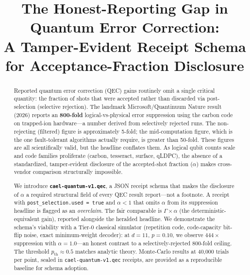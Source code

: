 \documentclass[conference]{IEEEtran}
\newcommand{\pth}{p_{\mathrm{th}}}  %
\newcommand{\af}{\alpha}            %
\newcommand{\suppfactor}{\Gamma}    %
\begin{document}
\title{The Honest-Reporting Gap in Quantum Error Correction:\\
A Tamper-Evident Receipt Schema for Acceptance-Fraction Disclosure}

\author{%
}

\maketitle

\begin{abstract}
Reported quantum error correction (QEC) gains routinely omit a single
critical quantity: the fraction of shots that were accepted rather than
discarded via post-selection (selective rejection).
The landmark Microsoft/Quantinuum Nature result (2026) reports an
\textbf{800-fold} logical-vs-physical error suppression using the carbon
code on trapped-ion hardware---a number derived from selectively rejected
runs. The non-rejecting (filtered) figure is approximately 5-fold; the
mid-computation figure, which is the one fault-tolerant algorithms
actually require, is greater than 50-fold. These figures are all
scientifically valid, but the headline conflates them. As logical qubit
counts scale and code families proliferate (carbon, tesseract, surface,
qLDPC), the absence of a standardized, tamper-evident disclosure of
the accepted-shot fraction ($\af$) makes cross-vendor comparison
structurally impossible.

We introduce \textbf{\texttt{cael-quantum-v1.qec}}, a JSON receipt schema
that makes the disclosure of $\af$ a required structural field of every
QEC result report---not a footnote. A receipt with
\texttt{post\_selection.used = true} and $\af < 1$ that omits $\af$ from
its suppression headline is flagged as an \emph{overclaim}. The fair
comparable is $\suppfactor \times \af$ (the deterministic-equivalent
gain), reported alongside the heralded headline. We demonstrate the
schema's viability with a Tier-0 classical simulator (repetition code,
code-capacity bit-flip noise, exact minimum-weight decoder): at
$d{=}11$, $p{=}0.10$, we observe $444\times$ suppression with
$\af = 1.0$---an honest contrast to a selectively-rejected 800-fold
ceiling. The threshold $\pth \approx 0.5$ matches analytic theory.
Monte-Carlo results at 40,000 trials per point, sealed in
\texttt{cael-quantum-v1.qec} receipts, are provided as a reproducible
baseline for schema adoption.
\end{abstract}
\end{document}
